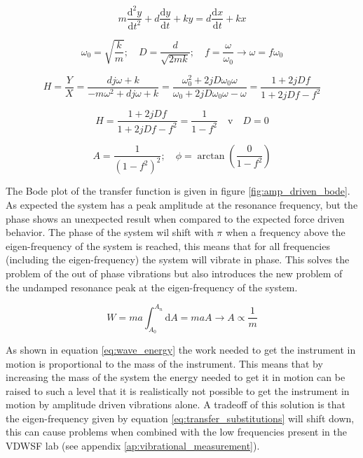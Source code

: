\documentclass[10pt]{article}
\begin{document}
\begin{equation}
    m \frac{\mathrm{d}^2 y}{\mathrm{d} t^2} + d \frac{\mathrm{d}y}{\mathrm{d}t} +ky = d\frac{\mathrm{d}x}{\mathrm{d}t} + kx
    \label{eq:krachten balans instrument}
\end{equation}

\begin{equation}
    \omega_0 = \sqrt{\frac{k}{m}}; \quad D = \frac{d}{\sqrt{2mk}}; \quad f = \frac{\omega}{\omega_0}\rightarrow \omega = f\omega_0
    \label{eq:transfer_substitutions}
\end{equation}

\begin{equation*}
    H = \frac{Y}{X} = \frac{dj\omega + k}{-m\omega^2 +dj\omega + k} = \frac{\omega_0^2 +2jD \omega_0 \omega}{\omega_0 + 2jD\omega_0 \omega - \omega} = \frac{1 + 2jDf}{1+ 2jDf - f^2}
    \label{eq:trilling overdracht met demping}
\end{equation*}

\begin{equation}
    H = \frac{1 + 2jDf}{1+ 2jDf - f^2} = \frac{1}{1 - f^2}\quad \mathrm{v}\quad D = 0
    \label{eq:trilling overdracht zonder demping}
\end{equation}

\begin{equation}
    A = \frac{1}{(1-f^2)^2}; \quad \phi = \arctan{\left( \frac{0}{1 - f^2}\right)}
    \label{eq:bode_amplitude}
\end{equation}

The Bode plot of the transfer function is given in figure \ref{fig:amp_driven_bode}.
As expected the system has a peak amplitude at the resonance frequency, but the phase shows an unexpected result when compared to the expected force driven behavior.
The phase of the system wil shift with $\pi$ when a frequency above the eigen-frequency of the system is reached, this means that for all frequencies (including the eigen-frequency) the system will vibrate in phase.
This solves the problem of the out of phase vibrations but also introduces the new problem of the undamped resonance peak at the eigen-frequency of the system.

\begin{equation}
  W = ma \int_{A_0}^{A_n} \mathrm{d}A = maA \rightarrow A \propto \frac{1}{m}
  \label{eq:wave_energy}
\end{equation}

As shown in equation \ref{eq:wave_energy} the work needed to get the instrument in motion is proportional to the mass of the instrument.
This means that by increasing the mass of the system the energy needed to get it in motion can be raised to such a level that it is realistically not possible to get the instrument in motion by amplitude driven vibrations alone.
A tradeoff of this solution is that the eigen-frequency given by equation \ref{eq:transfer_substitutions} will shift down, this can cause problems when combined with the low frequencies present in the VDWSF lab (see appendix \ref{ap:vibrational_measurement}).\\
\end{document}
